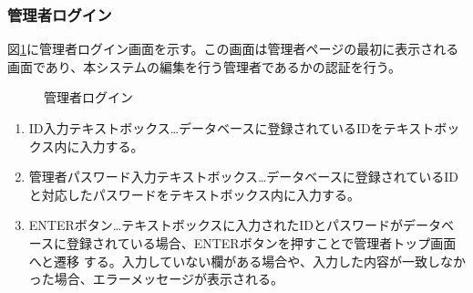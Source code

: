 \documentclass[a4j]{jarticle}
\begin{document}
\subsubsection{管理者ログイン}
図\ref{fig:login_admin}に管理者ログイン画面を示す。この画面は管理者ページの最初に表示される画面であり、本システムの編集を行う管理者であるかの認証を行う。
\begin{figure}[H]
\centering
{}
\caption{管理者ログイン}
\label{fig:login_admin}
\end{figure}
\begin{enumerate}
  \renewcommand{\labelenumi}{\textcircled{\scriptsize \theenumi}}

\item ID入力テキストボックス…データベースに登録されているIDをテキストボックス内に入力する。
\item 管理者パスワード入力テキストボックス…データベースに登録されているIDと対応したパスワードをテキストボックス内に入力する。
\item ENTERボタン…テキストボックスに入力されたIDとパスワードがデータベースに登録されている場合、ENTERボタンを押すことで管理者トップ画面へと遷移
する。入力していない欄がある場合や、入力した内容が一致しなかった場合、エラーメッセージが表示される。

\end{enumerate}
  \renewcommand{\labelenumi}{\textcircled{\scriptsize \theenumi}}
\end{document}
